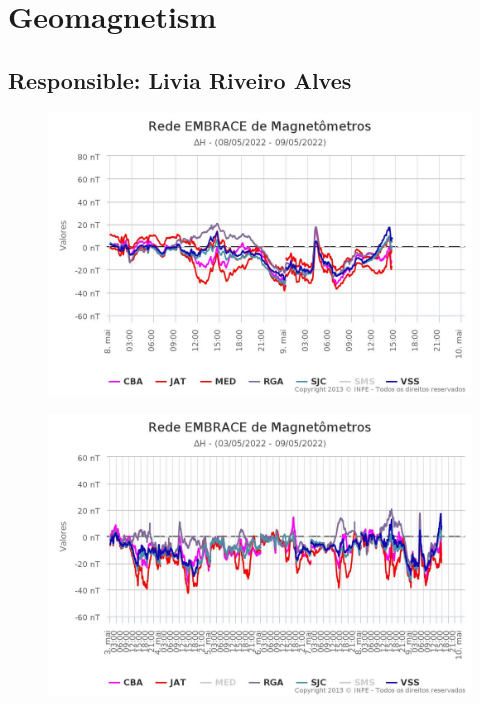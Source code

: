 \documentclass[a4paper, 10pt]{article}
\begin{document}
                     \section{Geomagnetism} 
 \subsection{Responsible: Livia Riveiro Alves} 
 
\begin{figure}[H]
    
                        \centering
   
                             \includegraphics[width=14cm]{./figures//figureGeomag_0.png}

                        \end{figure}

                     \begin{figure}[H]
    
                        \centering
   
                             \includegraphics[width=14cm]{./figures//figureGeomag_1.png}

                        \end{figure}
\end{document}
